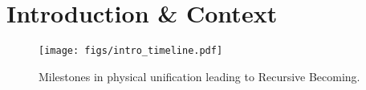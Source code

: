 \section{Introduction \& Context}
\label{sec:intro}

\begin{figure}[h]
  \centering
  \texttt{[image: figs/intro\_timeline.pdf]}
  \caption{Milestones in physical unification leading to Recursive Becoming.}
  \label{fig:intro-timeline}
\end{figure}
\clearpage 